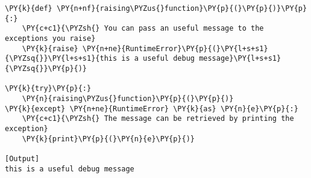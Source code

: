 \begin{Verbatim}[label=\makebox{\url{https://github.com/lucabaldini/cmepda/tree/master/slides/latex/snippets/raising.py}},commandchars=\\\{\}]
\PY{k}{def} \PY{n+nf}{raising\PYZus{}function}\PY{p}{(}\PY{p}{)}\PY{p}{:}
    \PY{c+c1}{\PYZsh{} You can pass an useful message to the exceptions you raise}
    \PY{k}{raise} \PY{n+ne}{RuntimeError}\PY{p}{(}\PY{l+s+s1}{\PYZsq{}}\PY{l+s+s1}{this is a useful debug message}\PY{l+s+s1}{\PYZsq{}}\PY{p}{)} 

\PY{k}{try}\PY{p}{:}
    \PY{n}{raising\PYZus{}function}\PY{p}{(}\PY{p}{)}
\PY{k}{except} \PY{n+ne}{RuntimeError} \PY{k}{as} \PY{n}{e}\PY{p}{:}
    \PY{c+c1}{\PYZsh{} The message can be retrieved by printing the exception}
    \PY{k}{print}\PY{p}{(}\PY{n}{e}\PY{p}{)}

[Output]
this is a useful debug message
\end{Verbatim}